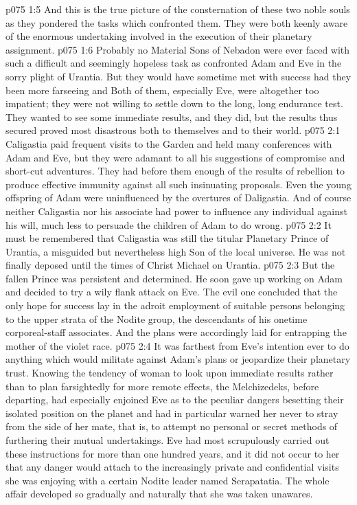 \vs p075 1:5 And this is the true picture of the consternation of these two noble souls as they pondered the tasks which confronted them. They were both keenly aware of the enormous undertaking involved in the execution of their planetary assignment.\plusone
\vs p075 1:6 Probably no Material Sons of Nebadon were ever faced with such a difficult and seemingly hopeless task as confronted Adam and Eve in the sorry plight of Urantia. But they would have sometime met with success had they been more farseeing and  Both of them, especially Eve, were altogether too impatient; they were not willing to settle down to the long, long endurance test. They wanted to see some immediate results, and they did, but the results thus secured proved most disastrous both to themselves and to their world.
\vs p075 2:1 Caligastia paid frequent visits to the Garden and held many conferences with Adam and Eve, but they were adamant to all his suggestions of compromise and short\hyp{}cut adventures. They had before them enough of the results of rebellion to produce effective immunity against all such insinuating proposals. Even the young offspring of Adam were uninfluenced by the overtures of Daligastia. And of course neither Caligastia nor his associate had power to influence any individual against his will, much less to persuade the children of Adam to do wrong.
\vs p075 2:2 It must be remembered that Caligastia was still the titular Planetary Prince of Urantia, a misguided but nevertheless high Son of the local universe. He was not finally deposed until the times of Christ Michael on Urantia.\plusone
\vs p075 2:3 But the fallen Prince was persistent and determined. He soon gave up working on Adam and decided to try a wily flank attack on Eve. The evil one concluded that the only hope for success lay in the adroit employment of suitable persons belonging to the upper strata of the Nodite group, the descendants of his onetime corporeal\hyp{}staff associates. And the plans were accordingly laid for entrapping the mother of the violet race.
\pc \vs p075 2:4 It was farthest from Eve’s intention ever to do anything which would militate against Adam’s plans or jeopardize their planetary trust. Knowing the tendency of woman to look upon immediate results rather than to plan farsightedly for more remote effects, the Melchizedeks, before departing, had especially enjoined Eve as to the peculiar dangers besetting their isolated position on the planet and had in particular warned her never to stray from the side of her mate, that is, to attempt no personal or secret methods of furthering their mutual undertakings. Eve had most scrupulously carried out these instructions for more than one hundred years, and it did not occur to her that any danger would attach to the increasingly private and confidential visits she was enjoying with a certain Nodite leader named Serapatatia. The whole affair developed so gradually and naturally that she was taken unawares.
